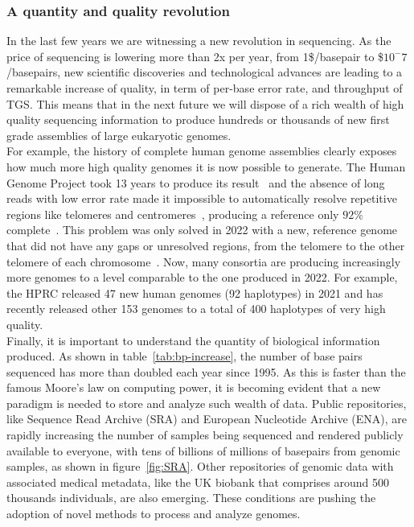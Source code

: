 \subsubsection{A quantity and quality revolution }
In the last few years we are witnessing a new revolution in sequencing. As the price of sequencing is lowering more than 2x per year, from 1\$/basepair to \$$10^-7$/basepairs\cite{durbin_recomb}, new scientific discoveries and technological advances are leading to a remarkable increase of quality, in term of per-base error rate, and throughput of TGS. This means that in the next future we will dispose of a rich wealth of high quality sequencing information to produce hundreds or thousands of new first grade assemblies of large eukaryotic genomes.\\
For example, the history of complete human genome assemblies clearly exposes how much more high quality genomes it is now possible to generate. The Human Genome Project took 13 years to produce its result~\cite{humangenomeproject} and the absence of long reads with low error rate made it impossible to automatically resolve repetitive regions like telomeres and centromeres~\cite{human-pangenomics-era}, producing a reference only $92\%$ complete~\cite{t2t}. This problem was only solved in 2022 with a new, reference genome that did not have any gaps or unresolved regions, from the telomere to the other telomere of each chromosome~\cite{t2t}. Now, many consortia are producing increasingly more genomes to a level comparable to the one produced in 2022. For example, the HPRC released 47 new human genomes (92 haplotypes) in 2021 and has recently released other 153 genomes to a total of 400 haplotypes of very high quality.\\
Finally, it is important to understand the quantity of biological information produced. As shown in table~\ref{tab:bp-increase}, the number of base pairs sequenced has more than doubled each year since 1995. As this is faster than the famous Moore's law on computing power, it is becoming evident that a new paradigm is needed to store and analyze such wealth of data. Public repositories, like Sequence Read Archive (\gls{SRA}) and European Nucleotide Archive (\gls{ENA}), are rapidly increasing the number of samples being sequenced and rendered publicly available to everyone, with tens of billions of millions of basepairs from genomic samples, as shown in figure~\ref{fig:SRA}. Other repositories of genomic data with associated medical metadata, like the UK biobank that comprises around 500 thousands individuals, are also emerging. These conditions are pushing the adoption of novel methods to process and analyze genomes.

